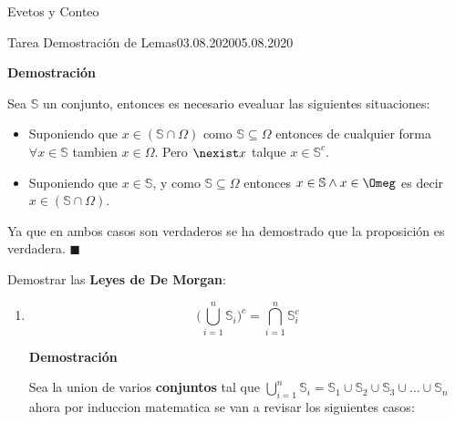 \documentclass[a4paper]{book}
\begin{document}
\begin{chapter}{Evetos y Conteo}
\begin{tarea}{Tarea Demostración de Lemas}{03.08.2020}{05.08.2020}
\begin{enumerate}
                \textbf{Demostración}

                Sea $\mathbb S$ un conjunto, entonces es necesario evealuar las
                siguientes situaciones:
                \begin{itemize}
                    \item Suponiendo que $x\in\left(\mathbb S\cap\Omega\right)$
                        como $\mathbb S\subseteq\Omega$ entonces de cualquier
                        forma $\forall x\in\mathbb S$ tambien $x\in\Omega$.
                        Pero $\nexist x$ talque $x\in\mathbb S^{c}$.

                    \item Suponiendo que $x\in\mathbb S$, y como $\mathbb
                        S\subseteq\Omega$ entonces $x\in\mathbb S\land
                        x\in\Omeg$ es decir $x\in\left(\mathbb
                        S\cap\Omega\right)$.
                \end{itemize}

                Ya que en ambos casos son verdaderos se ha demostrado que la
                proposición es verdadera. $\blacksquare$
            \end{enumerate}

        \item Demostrar las \textbf{Leyes de De Morgan}:
            \begin{enumerate}
                \item \[\Big(\bigcup_{i=1}^{n}\mathbb S_{i}\Big)^{c} = \bigcap_{i=1}^{n}\mathbb S_{i}^{c}\]

                \textbf{Demostración}

                Sea la union de varios \textbf{conjuntos} tal que
                    $\bigcup_{i=1}^{n}\mathbb S_{i}=\mathbb S_{1}\cup\mathbb
                    S_{2}\cup\mathbb S_{3}\cup...\cup\mathbb S_{n}$ ahora por
                    induccion matematica se van a revisar los siguientes casos:


\end{enumerate}
\end{tarea}
\end{chapter}
\end{document}
